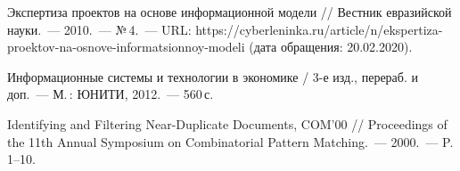 \begin{thebibliography}{99}
\bibitem{} Экспертиза проектов на основе информационной модели // Вестник евразийской науки.~--- 2010.~--- №\,4.~--- URL: https://cyberleninka.ru/article/n/ekspertiza-proektov-na-osnove-informatsionnoy-modeli (дата обращения: 20.02.2020).


\bibitem{} Информационные системы и технологии в экономике / 3-е изд., перераб. и доп.~--- М.\,: ЮНИТИ, 2012.~--- 560\,с.

\bibitem{} Identifying and Filtering Near-Duplicate Documents, COM’00 // Proceedings of the 11th Annual Symposium on Combinatorial Pattern Matching.~--- 2000.~--- P.\,1--10.
\end{thebibliography}
\thispagestyle{empty}
